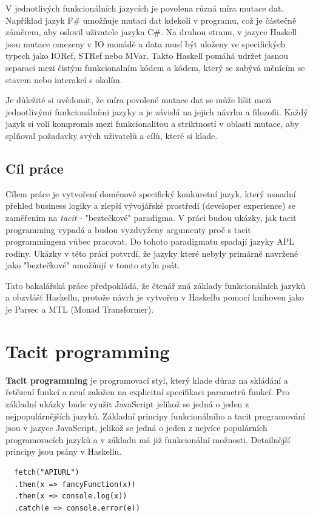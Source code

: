 \documentclass[male,czech]{kithesis}
\begin{document}
V jednotlivých funkcionálních jazycích je povolena různá míra mutace dat. 
Například jazyk F\# umožňuje mutaci dat kdekoli v programu, což je částečně záměrem, 
aby oslovil uživatele jazyka C\#. Na druhou stranu, 
v jazyce Haskell jsou mutace omezeny v IO monádě a data musí být uloženy 
ve specifických typech jako IORef, STRef nebo MVar. Takto Haskell 
pomáhá udržet jasnou separaci mezi čistým funkcionalním kódem a kódem, 
který se zabývá měnícím se stavem nebo interakcí s okolím.


Je důležité si uvědomit, že míra povolené mutace dat se může lišit mezi jednotlivými funkcionálními jazyky a je závislá na jejich návrhu a filozofii. Každý jazyk si volí kompromis mezi funkcionalitou a striktností v oblasti mutace, aby splňoval požadavky svých uživatelů a cílů, které si klade.

\section{Cíl práce}

Cílem práce je vytvoření doménově specifický konkuretní jazyk, který usnadní přehled business logiky a zlepší 
vývojářské prostředí (developer experience) se zaměřením na \textit{tacit} - "beztečkové" paradigma.
V práci budou ukázky, jak
tacit programming vypadá a budou vyzdvyženy argumenty proč s tacit programmingem
vůbec pracovat.
Do tohoto paradigmatu spadají jazyky APL rodiny. 
Ukázky v této práci potvrdí, že jazyky které nebyly primárně navržené jako "beztečkové" 
umožňují v tomto stylu psát.

Tato bakalářská práce předpokládá, že čtenář zná základy funkcionálních jazyků a obzvlášť Haskellu, 
protože návrh je vytvořen v Haskellu pomocí knihoven jako je Parsec a MTL (Monad Transformer).

\chapter{Tacit programming}
\textbf{Tacit programming} je programovací styl, 
který klade důraz na skládání a řetězení funkcí a není založen na explicitní specifikaci parametrů funkcí.
Pro základní ukázky bude využit JavaScript jelikož se jedná o jeden z nejpopulárnějších jazyků. 
Základní principy funkcionálního a tacit programování jsou v jazyce JavaScript,
jelikož se jedná o jeden z nejvíce populárních programovacích jazyků a v základu má již funkcionální možnosti.
Detailnější principy jsou psány v Haskellu.
\begin{verbatim}
  fetch("APIURL")
  .then(x => fancyFunction(x))
  .then(x => console.log(x))
  .catch(e => console.error(e))
\end{verbatim}
\end{document}
